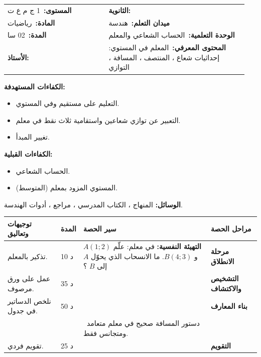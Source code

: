 \documentclass[12pt,a4paper]{article}
\makeatletter
\newenvironment{LTR}{\begin{otherlanguage}{english}}{\end{otherlanguage}}
\newcommand{\ar}[1]{\foreignlanguage{arabic}{#1}}
\newcommand{\Phase}[1]{\textbf{#1}}
\newcommand{\Fld}[2]{\textbf{#1:}\ #2}
\newcommand{\ModhHead}[9]{%
\begin{LTR}
\begin{tcolorbox}[enhanced,colback=white,colframe=cThm!85!black,arc=4mm,boxrule=1pt,top=14pt,bottom=6pt,left=8pt,right=8pt,
 overlay={\node[fill=cThm!85!black,text=white,rounded corners=3mm,inner xsep=14pt,inner ysep=4pt,font=\large\bfseries] at ([yshift=0pt]frame.north){\ar{مذكرة رقم #1}};},
 before upper={\selectlanguage{arabic}}]
\begin{tabular}{@{}p{0.4\linewidth}p{0.55\linewidth}@{}}
\Fld{المستوى}{#2} & \Fld{الثانوية}{\dotfill}\\[3pt]
\Fld{المادة}{رياضيات} & \Fld{ميدان التعلم}{#3}\\[3pt]
\Fld{المدة}{#5} & \Fld{الوحدة التعلمية}{#4}\\[3pt]
\Fld{الأستاذ}{\dotfill} & \Fld{المحتوى المعرفي}{#6}\\
\end{tabular}
\end{tcolorbox}
\begin{tcolorbox}[enhanced,colback=white,colframe=cThm!85!black,arc=3mm,boxrule=0.8pt,sidebyside,sidebyside align=top,lefthand ratio=0.5,
 segmentation style={dashed,cThm!60},before upper={\selectlanguage{arabic}},before lower={\selectlanguage{arabic}}]
\textbf{الكفاءات المستهدفة:}\par #8
\tcblower
\textbf{الكفاءات القبلية:}\par #7
\end{tcolorbox}
\end{LTR}
\par\smallskip\textbf{الوسائل:} #9\par\smallskip}
\newenvironment{Sayr}{%
\begin{LTR}\renewcommand{\arraystretch}{1.25}
\begin{longtable}{|p{0.17\textwidth}|>{\centering\arraybackslash}p{0.06\textwidth}|p{0.53\textwidth}|>{\centering\arraybackslash}p{0.12\textwidth}|}
\hline\rowcolor{cThm!12}\ar{\textbf{توجيهات وتعاليق}} & \ar{\textbf{المدة}} & \ar{\textbf{سير الحصة}} & \ar{\textbf{مراحل الحصة}}\\\hline\endhead
\hline\endfoot}{\end{longtable}\end{LTR}}
\newcommand{\Row}[4]{\ar{\small #4} & \ar{#3} & \ar{#2} & \cellcolor{cThm!8}\ar{\Phase{#1}}\\\hline}
\newcommand{\Lab}[2]{\foreignlanguage{english}{\tcbox[on line,colback=#1,colframe=#1,boxrule=0pt,arc=2pt,boxsep=1pt,left=5pt,right=5pt,top=1pt,bottom=1pt]{\ar{\textcolor{white}{\textbf{#2}}}}}}
\newcommand{\Num}[1]{\foreignlanguage{english}{\tikz[baseline=(c.base)]\node[fill=cDef,text=white,inner sep=2pt,font=\footnotesize\bfseries](c){#1};}}
\newcommand{\ck}{\ensuremath{{\color{cRem}\checkmark}}}
\makeatother
\begin{document}
\newpage
\ModhHead{20}{1 ج م ع ت}{هندسة}{الحساب الشعاعي والمعلم}{02 سا}{المعلم في المستوي: إحداثيات شعاع ، المنتصف ، المسافة ، التوازي}%
{\begin{itemize}\item الحساب الشعاعي.\item المستوي المزود بمعلم (المتوسط).\end{itemize}}%
{\begin{itemize}\item التعليم على مستقيم وفي المستوي.\item التعبير عن توازي شعاعين واستقامية ثلاث نقط في معلم.\item تغيير المبدأ.\end{itemize}}%
{المنهاج ، الكتاب المدرسي ، مراجع ، أدوات الهندسة.}
\begin{Sayr}
\Row{مرحلة الانطلاق}{%
\textbf{التهيئة النفسية:} في معلم: علّم $A(1;2)$ و $B(4;3)$. ما الانسحاب الذي يحوّل $A$ إلى $B$ ؟}{10 د}{تذكير بالمعلم.}
\Row{التشخيص والاكتشاف}{%
\Lab{cEx}{مناقشة نشاط 05 صفحة 253}\par\ck\ في معلم $(O;\vec i,\vec j)$ كل شعاع يُكتب بطريقة وحيدة $\vec u=x\vec i+y\vec j$: نكتب $\vec u(x;y)$.\par
\ck\ $\overrightarrow{AB}=(x_B-x_A)\vec i+(y_B-y_A)\vec j$: مثلاً $\overrightarrow{AB}(3;1)$.\par
}{35 د}{عمل على ورق مرصوف.}
\Row{بناء المعارف}{%
\Lab{cThm}{خاصية}\par\ck\ $\overrightarrow{AB}(x_B-x_A;y_B-y_A)$ ؛ منتصف $[AB]$: $\Big(\dfrac{x_A+x_B}2;\dfrac{y_A+y_B}2\Big)$.\par
\ck\ في معلم \textbf{متعامد ومتجانس}: $AB=\sqrt{(x_B-x_A)^2+(y_B-y_A)^2}$.\par
\ck\ $\vec u(x;y)$ و $\vec v(x^{\prime};y^{\prime})$ مرتبطان خطياً $\iff xy^{\prime}-x^{\prime}y=0$.\par
\ck\ \textbf{تغيير المبدأ:} في المعلم $(\Omega;\vec i,\vec j)$ حيث $\Omega(a;b)$: $X=x-a$ و $Y=y-b$.\par
\Lab{cEx}{مثال}\ $A(1;2)$ ، $B(4;3)$ ، $C(7;4)$: $\overrightarrow{AB}(3;1)$ و $\overrightarrow{AC}(6;2)$ ، $3\times2-1\times6=0$: النقط على استقامة واحدة ، و $AB=\sqrt{10}$.\par}{50 د}{نلخص الدساتير في جدول.}
\Row{}{%
\Lab{cThm!80!black}{حذار}\ دستور المسافة صحيح في معلم متعامد ومتجانس فقط.}{}{}
\Row{التقويم}{%
\Lab{cEx}{تطبيق}\par\Num{1} هل $\vec u(2;-3)$ و $\vec v(-4;6)$ مرتبطان خطياً؟ \Num{2} $A(1;1)$ ، $B(3;2)$ ، $C(4;5)$: عيّن $D$ حيث $ABCD$ متوازي أضلاع.\par\textbf{الحل:} \Num{1} $2\times6-(-3)(-4)=0$: نعم ؛ \Num{2} $\overrightarrow{AD}=\overrightarrow{BC}(1;3)$ ، إذن $D(2;4)$.\par\textbf{واجب منزلي:} تمارين من الكتاب المدرسي.\par\smallskip\textbf{ملاحظات حول سير الحصة:} \dotfill}{25 د}{تقويم فردي.}
\end{Sayr}
\end{document}
